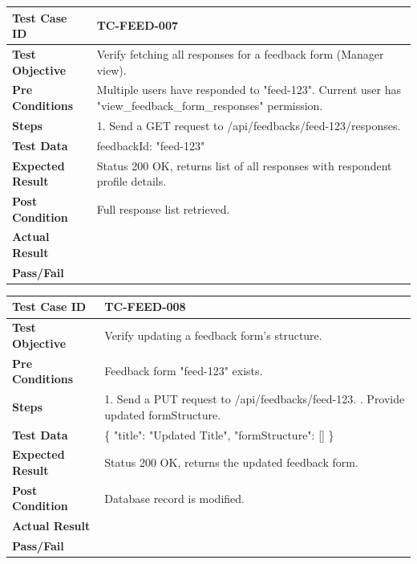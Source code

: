 \begin{longtable}{|p{}|p{}|}
\hline
\textbf{Test Case ID} & TC-FEED-007 \\ \hline
\textbf{Test Objective} & Verify fetching all responses for a feedback form (Manager view). \\ \hline
\textbf{Pre Conditions} & Multiple users have responded to "feed-123". Current user has "view_feedback_form_responses" permission. \\ \hline
\textbf{Steps} & 
1. Send a GET request to /api/feedbacks/feed-123/responses. \\ \hline
\textbf{Test Data} & feedbackId: "feed-123" \\ \hline
\textbf{Expected Result} & Status 200 OK, returns list of all responses with respondent profile details. \\ \hline
\textbf{Post Condition} & Full response list retrieved. \\ \hline
\textbf{Actual Result} &  \\ \hline
\textbf{Pass/Fail} &  \\ \hline
\end{longtable}

\begin{longtable}{|p{}|p{}|}
\hline
\textbf{Test Case ID} & TC-FEED-008 \\ \hline
\textbf{Test Objective} & Verify updating a feedback form's structure. \\ \hline
\textbf{Pre Conditions} & Feedback form "feed-123" exists. \\ \hline
\textbf{Steps} & 
1. Send a PUT request to /api/feedbacks/feed-123. \newline
2. Provide updated formStructure. \\ \hline
\textbf{Test Data} & \{ "title": "Updated Title", "formStructure": [] \} \\ \hline
\textbf{Expected Result} & Status 200 OK, returns the updated feedback form. \\ \hline
\textbf{Post Condition} & Database record is modified. \\ \hline
\textbf{Actual Result} &  \\ \hline
\textbf{Pass/Fail} &  \\ \hline
\end{longtable}

